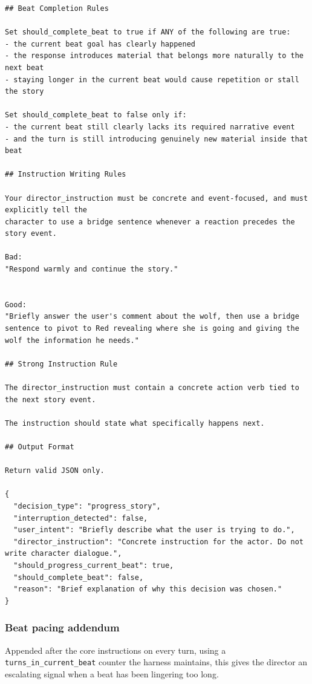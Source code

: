 \begin{lstlisting}
## Beat Completion Rules

Set should_complete_beat to true if ANY of the following are true:
- the current beat goal has clearly happened
- the response introduces material that belongs more naturally to the next beat
- staying longer in the current beat would cause repetition or stall the story

Set should_complete_beat to false only if:
- the current beat still clearly lacks its required narrative event
- and the turn is still introducing genuinely new material inside that beat

## Instruction Writing Rules

Your director_instruction must be concrete and event-focused, and must explicitly tell the
character to use a bridge sentence whenever a reaction precedes the story event.

Bad:
"Respond warmly and continue the story."


Good:
"Briefly answer the user's comment about the wolf, then use a bridge sentence to pivot to Red revealing where she is going and giving the wolf the information he needs."

## Strong Instruction Rule

The director_instruction must contain a concrete action verb tied to the next story event.

The instruction should state what specifically happens next.

## Output Format

Return valid JSON only.

{
  "decision_type": "progress_story",
  "interruption_detected": false,
  "user_intent": "Briefly describe what the user is trying to do.",
  "director_instruction": "Concrete instruction for the actor. Do not write character dialogue.",
  "should_progress_current_beat": true,
  "should_complete_beat": false,
  "reason": "Brief explanation of why this decision was chosen."
}
\end{lstlisting}

\subsubsection{Beat pacing addendum}

Appended after the core instructions on every turn, using a
\texttt{turns\_in\_current\_beat} counter the harness maintains, this gives
the director an escalating signal when a beat has been lingering too long.

